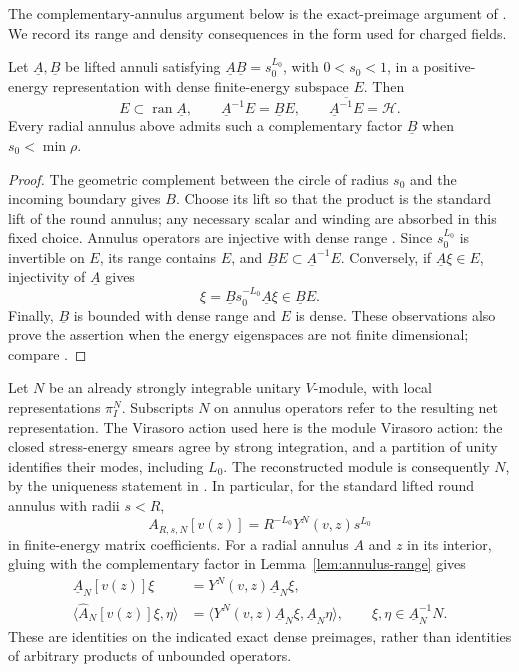 The complementary-annulus argument below is the exact-preimage
argument of \cite[Lemma~7.9]{HTVOA}. We record its range and density
consequences in the form used for charged fields.

\begin{lemma}\label{lem:annulus-range}
Let $\underline A,\underline B$ be lifted annuli satisfying
$\underline A\underline B=s_0^{L_0}$, with $0<s_0<1$, in a
positive-energy representation with dense finite-energy subspace $E$.
Then
\[
 E\subset\operatorname{ran}\underline A,
 \qquad \underline A^{-1}E=\underline B E,
 \qquad \overline{\underline A^{-1}E}=\mathcal H.
\]
Every radial annulus above admits such a complementary factor
$\underline B$ when $s_0<\min\rho$.
\end{lemma}

\begin{proof}
The geometric complement between the circle of radius $s_0$ and the
incoming boundary gives $B$.  Choose its lift so that the product is the
standard lift of the round annulus; any necessary scalar and winding are
absorbed in this fixed choice.  Annulus operators are injective with
dense range \cite[Lemma~4.15]{HTVOA}.  Since $s_0^{L_0}$ is invertible on
$E$, its range contains $E$, and $\underline B E\subset
\underline A^{-1}E$.  Conversely, if $\underline A\xi\in E$, injectivity
of $\underline A$ gives
\[
 \xi=\underline B s_0^{-L_0}\underline A\xi\in\underline B E.
\]
Finally, $\underline B$ is bounded with dense range and $E$ is dense.
These observations also prove the assertion when the energy eigenspaces
are not finite dimensional; compare \cite[Lemma~7.9]{HTVOA}.
\end{proof}

Let $N$ be an already strongly integrable unitary $V$-module, with local
representations $\pi_I^N$.  Subscripts $N$ on annulus operators refer to
the resulting net representation.  The Virasoro action used here is the
module Virasoro action: the closed stress-energy smears agree by strong
integration, and a partition of unity identifies their modes, including
$L_0$.  The reconstructed module is consequently $N$, by the uniqueness
statement in \cite[Theorem~9.5(ii) and Corollary~9.6]{HTVOA}.
In particular, for the standard lifted round annulus with radii $s<R$,
\begin{equation}\label{eq:round-insertion}
 A_{R,s,N}[v(z)]=R^{-L_0}Y^N(v,z)s^{L_0}
\end{equation}
in finite-energy matrix coefficients.  For a radial annulus $A$ and
$z$ in its interior, gluing with the complementary factor in
Lemma~\ref{lem:annulus-range} gives
\begin{equation}\label{eq:annulus-insertion}
 \begin{split}
 \underline A_N[v(z)]\xi
   &=Y^N(v,z)\underline A_N\xi,\\
 \langle\widehat A_N[v(z)]\xi,\eta\rangle
   &=\langle Y^N(v,z)\underline A_N\xi,
                         \underline A_N\eta\rangle,
 \qquad \xi,\eta\in\underline A_N^{-1}N.
 \end{split}
\end{equation}
These are identities on the indicated exact dense preimages, rather than
identities of arbitrary products of unbounded operators.

